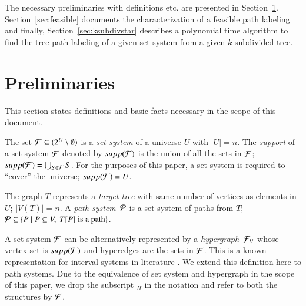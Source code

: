 \documentclass[MS]             %
              {iitmdiss}
\begin{document}

 The necessary preliminaries with definitions
etc. are presented in
Section~\ref{sec:prelims}. Section~\ref{sec:feasible} documents the
characterization of a feasible path labeling and finally,
Section~\ref{sec:ksubdivstar} describes a polynomial time algorithm to
find the tree path labeling of a given set system from a given
$k$-subdivided tree.

\section{Preliminaries} 
\label{sec:prelims} 

This section states definitions and basic facts necessary in the scope
of this document.

\def\xnoindent {}

The set ${\mathcal F} \subseteq (2^{U} \setminus \emptyset)$ is a {\em set
  system} of a universe $U$ with $|U| = n$.  The {\em support} of a
set system ${\mathcal F}$ denoted by $supp({\cal F})$ is the union of all the sets in
${\mathcal F}$; $supp({\mathcal F}) = \bigcup_{S \in {\mathcal F}}S$. For the purposes of this
paper, a set system is required to ``cover'' the universe; $
supp({\cal F}) = U$.

\xnoindent The graph $T$ represents a {\em target tree} with same
number of vertices as elements in $U$; $|V(T)| = n$.  A {\em path
  system}\, ${\cal P}$ is a set system of paths from $T$; ${\cal P} \subseteq \{P
\mid P \subseteq V, \text{ } T[P] \text{ is a path} \}$.

\xnoindent
A set system ${\cal F}$ can be alternatively represented by a {\em
  hypergraph}\, ${\cal F}_H$ whose vertex set is $supp({\cal F})$ and hyperedges
are the sets in ${\cal F}$. This is a known representation for interval
systems in literature \cite{bls99,kklv10}.  We extend this definition here to
path systems. Due to the equivalence of set system and hypergraph in
the scope of this paper, we drop the
subscript $_H$ in the notation and refer to both the structures by ${\cal F}$.
\end{document}
